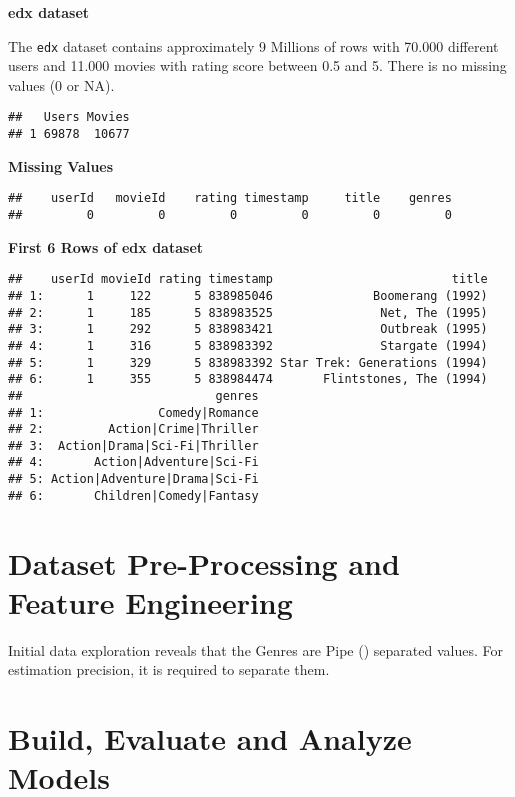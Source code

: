 \documentclass[
]{article}
\begin{document}
\textbf{edx dataset}

The \texttt{edx} dataset contains approximately 9 Millions of rows with
70.000 different users and 11.000 movies with rating score between 0.5
and 5. There is no missing values (0 or NA).

\begin{verbatim}
##   Users Movies
## 1 69878  10677
\end{verbatim}

\textbf{Missing Values}

\begin{verbatim}
##    userId   movieId    rating timestamp     title    genres 
##         0         0         0         0         0         0
\end{verbatim}

\textbf{First 6 Rows of edx dataset}

\begin{verbatim}
##    userId movieId rating timestamp                         title
## 1:      1     122      5 838985046              Boomerang (1992)
## 2:      1     185      5 838983525               Net, The (1995)
## 3:      1     292      5 838983421               Outbreak (1995)
## 4:      1     316      5 838983392               Stargate (1994)
## 5:      1     329      5 838983392 Star Trek: Generations (1994)
## 6:      1     355      5 838984474       Flintstones, The (1994)
##                           genres
## 1:                Comedy|Romance
## 2:         Action|Crime|Thriller
## 3:  Action|Drama|Sci-Fi|Thriller
## 4:       Action|Adventure|Sci-Fi
## 5: Action|Adventure|Drama|Sci-Fi
## 6:       Children|Comedy|Fantasy
\end{verbatim}

\newpage

\hypertarget{dataset-pre-processing-and-feature-engineering}{%
\section{Dataset Pre-Processing and Feature
Engineering}\label{dataset-pre-processing-and-feature-engineering}}

Initial data exploration reveals that the Genres are Pipe (\textbar)
separated values. For estimation precision, it is required to separate
them.

\hypertarget{build-evaluate-and-analyze-models}{%
\section{Build, Evaluate and Analyze
Models}\label{build-evaluate-and-analyze-models}}
\end{document}
